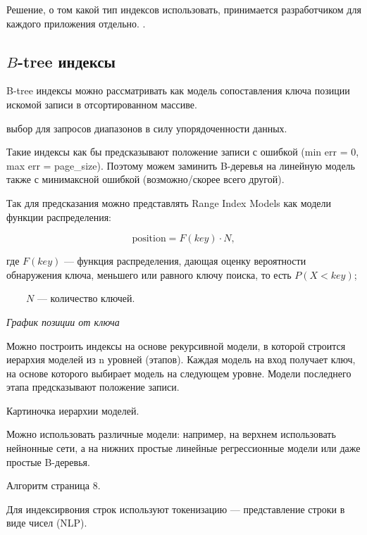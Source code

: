 Решение, о том какой тип индексов использовать, принимается разработчиком для
каждого приложения отдельно. .

\subsection{$B$-tree индексы}

B-tree индексы можно рассматривать как модель сопоставления ключа позиции
искомой записи в отсортированном массиве.

 выбор для запросов диапазонов в силу упорядоченности данных.

Такие индексы как бы предсказывают положение записи с  ошибкой (min err = 0, max err = page\_size). Поэтому можем заминить
B-деревья на линейную модель также с минимаксной ошибкой (возможно/скорее всего
другой).

Так для предсказания можно представлять Range Index Models как модели функции
распределения:

\begin{equation}
    \text{position} = F(key) \cdot N,
\end{equation}


где $F(key)$ --- функция распределения, дающая оценку вероятности обнаружения
ключа, меньшего или равного ключу поиска, то есть $P(X < key)$;

~~~~$N$ --- количество ключей.

\textit{График позиции от ключа}

Можно построить индексы на основе рекурсивной модели, в которой строится
иерархия моделей из n уровней (этапов). Каждая модель на вход получает ключ, на
основе которого выбирает модель на следующем уровне. Модели последнего этапа
предсказывают положение записи.

Картиночка иерархии моделей.

Можно использовать различные модели: например, на верхнем использовать нейнонные
сети, а на нижних простые линейные регрессионные модели или даже простые
B-деревья.

Алгоритм страница 8.

Для индексирвония строк используют токенизацию --- представление строки в виде
чисел (NLP).


